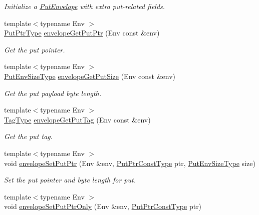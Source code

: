 \begin{DoxyCompactItemize}
\begin{DoxyCompactList}\small\item\em Initialize a {\ttfamily \hyperlink{structvt_1_1_put_envelope}{Put\+Envelope}} with extra put-\/related fields. \end{DoxyCompactList}\item 
{\footnotesize template$<$typename Env $>$ }\\\hyperlink{namespacevt_a537693bfe0223c71eb52bdbd6ea2c741}{Put\+Ptr\+Type} \hyperlink{namespacevt_a56ab014300930ba8ffc902793035eca2}{envelope\+Get\+Put\+Ptr} (Env const \&env)
\begin{DoxyCompactList}\small\item\em Get the put pointer. \end{DoxyCompactList}\item 
{\footnotesize template$<$typename Env $>$ }\\\hyperlink{namespacevt_aa241444e21c15238e185923792814fe4}{Put\+Env\+Size\+Type} \hyperlink{namespacevt_abbd3e4684f30ad052e43a1655f540b6f}{envelope\+Get\+Put\+Size} (Env const \&env)
\begin{DoxyCompactList}\small\item\em Get the put payload byte length. \end{DoxyCompactList}\item 
{\footnotesize template$<$typename Env $>$ }\\\hyperlink{namespacevt_a84ab281dae04a52a4b243d6bf62d0e52}{Tag\+Type} \hyperlink{namespacevt_aaf50340390d58fe42775ae5b8e413f28}{envelope\+Get\+Put\+Tag} (Env const \&env)
\begin{DoxyCompactList}\small\item\em Get the put tag. \end{DoxyCompactList}\item 
{\footnotesize template$<$typename Env $>$ }\\void \hyperlink{namespacevt_a17f0a4c162ef2b8337dfeab15f1c3a5b}{envelope\+Set\+Put\+Ptr} (Env \&env, \hyperlink{namespacevt_a494d6c6dc5cdb9a8d61eaedfa2c4d4f3}{Put\+Ptr\+Const\+Type} ptr, \hyperlink{namespacevt_aa241444e21c15238e185923792814fe4}{Put\+Env\+Size\+Type} size)
\begin{DoxyCompactList}\small\item\em Set the put pointer and byte length for put. \end{DoxyCompactList}\item 
{\footnotesize template$<$typename Env $>$ }\\void \hyperlink{namespacevt_a4e63ee5cc991a0a2052300feaae4bd4e}{envelope\+Set\+Put\+Ptr\+Only} (Env \&env, \hyperlink{namespacevt_a494d6c6dc5cdb9a8d61eaedfa2c4d4f3}{Put\+Ptr\+Const\+Type} ptr)

\end{DoxyCompactItemize}
